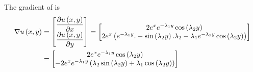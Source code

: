 The gradient of  is
\begin{equation}
  \begin{aligned}
    \gradient{}{\fnof{u}{x,y}}&=\begin{bmatrix}
    \delby{\fnof{u}{x,y}}{x} \\
    \delby{\fnof{u}{x,y}}{y}
    \end{bmatrix}=\begin{bmatrix}
    2e^{x}e^{-\lambda_{1}{y}}\cosine{\lambda_{2}y} \\
    2e^{x}\pbrac{e^{-\lambda_{1}{y}}.-\sine{\lambda_{2}y}.\lambda_{2}-\lambda_{1}e^{-\lambda_{1}{y}}\cosine{\lambda_{2}y}}
    \end{bmatrix} \\
    &=\begin{bmatrix}
    2e^{x}e^{-\lambda_{1}{y}}\cosine{\lambda_{2}y} \\
    -2e^{x}e^{-\lambda_{1}{y}}\pbrac{\lambda_{2}\sine{\lambda_{2}y}+\lambda_{1}\cosine{\lambda_{2}y}}
    \end{bmatrix}
  \end{aligned}
  \label{eqn:GeneralisedLaplaceTwoDAnalyticGradient1}
\end{equation}

